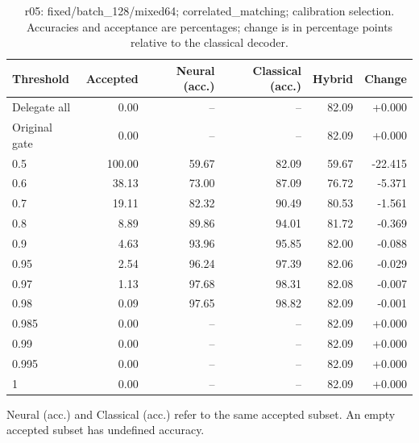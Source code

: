 \begin{table}[htbp]
\centering\small
\setlength{\tabcolsep}{3pt}
\caption{r05: fixed/batch\_128/mixed64; correlated\_matching; calibration selection. Accuracies and acceptance are percentages; change is in percentage points relative to the classical decoder.}
\begin{tabular}{lrrrrr}
\toprule
Threshold & Accepted & Neural (acc.) & Classical (acc.) & Hybrid & Change \\
\midrule
Delegate all & 0.00 & -- & -- & 82.09 & +0.000 \\
Original gate & 0.00 & -- & -- & 82.09 & +0.000 \\
0.5 & 100.00 & 59.67 & 82.09 & 59.67 & -22.415 \\
0.6 & 38.13 & 73.00 & 87.09 & 76.72 & -5.371 \\
0.7 & 19.11 & 82.32 & 90.49 & 80.53 & -1.561 \\
0.8 & 8.89 & 89.86 & 94.01 & 81.72 & -0.369 \\
0.9 & 4.63 & 93.96 & 95.85 & 82.00 & -0.088 \\
0.95 & 2.54 & 96.24 & 97.39 & 82.06 & -0.029 \\
0.97 & 1.13 & 97.68 & 98.31 & 82.08 & -0.007 \\
0.98 & 0.09 & 97.65 & 98.82 & 82.09 & -0.001 \\
0.985 & 0.00 & -- & -- & 82.09 & +0.000 \\
0.99 & 0.00 & -- & -- & 82.09 & +0.000 \\
0.995 & 0.00 & -- & -- & 82.09 & +0.000 \\
1 & 0.00 & -- & -- & 82.09 & +0.000 \\
\bottomrule
\end{tabular}
\par\smallskip\footnotesize Neural (acc.) and Classical (acc.) refer to the same accepted subset. An empty accepted subset has undefined accuracy.
\end{table}

